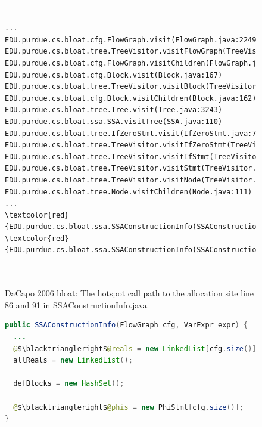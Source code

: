 \documentclass[sigconf,10pt,review,anonymous]{acmart}\settopmatter{printfolios=true,printccs=false,printacmref=false}
\begin{document}
\begin{figure}
\begin{minipage}{\linewidth}
\scriptsize
 \begin{Verbatim}[commandchars=\\\{\}]
-------------------------------------------------------------
...
EDU.purdue.cs.bloat.cfg.FlowGraph.visit(FlowGraph.java:2249)
EDU.purdue.cs.bloat.tree.TreeVisitor.visitFlowGraph(TreeVisitor.java:94)
EDU.purdue.cs.bloat.cfg.FlowGraph.visitChildren(FlowGraph.java:2235)
EDU.purdue.cs.bloat.cfg.Block.visit(Block.java:167)
EDU.purdue.cs.bloat.tree.TreeVisitor.visitBlock(TreeVisitor.java:99)
EDU.purdue.cs.bloat.cfg.Block.visitChildren(Block.java:162)
EDU.purdue.cs.bloat.tree.Tree.visit(Tree.java:3243)
EDU.purdue.cs.bloat.ssa.SSA.visitTree(SSA.java:110)
EDU.purdue.cs.bloat.tree.IfZeroStmt.visit(IfZeroStmt.java:78)
EDU.purdue.cs.bloat.tree.TreeVisitor.visitIfZeroStmt(TreeVisitor.java:124)
EDU.purdue.cs.bloat.tree.TreeVisitor.visitIfStmt(TreeVisitor.java:114)
EDU.purdue.cs.bloat.tree.TreeVisitor.visitStmt(TreeVisitor.java:219)
EDU.purdue.cs.bloat.tree.TreeVisitor.visitNode(TreeVisitor.java:369)
EDU.purdue.cs.bloat.tree.Node.visitChildren(Node.java:111)
...
\textcolor{red}{EDU.purdue.cs.bloat.ssa.SSAConstructionInfo(SSAConstructionInfo.java:86)}
\textcolor{red}{EDU.purdue.cs.bloat.ssa.SSAConstructionInfo(SSAConstructionInfo.java:91)}
-------------------------------------------------------------
\end{Verbatim}
\end{minipage}
\vspace{-3ex}
\caption{DaCapo 2006 bloat: The hotspot call path to the allocation site line 86 and 91 in SSAConstructionInfo.java.}
\label{bloat call path}
\end{figure}

\begin{figure}
\begin{lstlisting}[firstnumber=84,language=java]
public SSAConstructionInfo(FlowGraph cfg, VarExpr expr) {
  ...
  @$\blacktriangleright$@reals = new LinkedList[cfg.size()];
  allReals = new LinkedList();
  
  defBlocks = new HashSet();
  
  @$\blacktriangleright$@phis = new PhiStmt[cfg.size()];
}
\end{lstlisting}
\vspace{-0.3in}
\label{bloat}
\end{figure}
\end{document}
